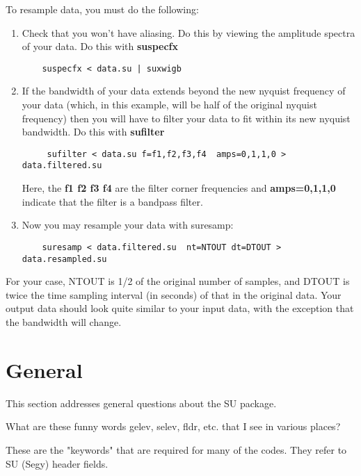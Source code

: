 {{{{{{{\begin{rmans}
To resample data, you must do the following: 

\begin{enumerate}
\item Check that you won't have aliasing. Do this by viewing the amplitude
spectra of your data. Do this with {\bf suspecfx\/}
{\small \begin{verbatim}
    suspecfx < data.su | suxwigb
\end{verbatim}} \noindent
\item If the bandwidth of your data extends beyond the new nyquist frequency
of your data (which, in this example, will be half of the original nyquist
frequency) then you will have to filter your data to fit within
its new nyquist bandwidth. Do this with {\bf sufilter\/}
{\small \begin{verbatim}
     sufilter < data.su f=f1,f2,f3,f4  amps=0,1,1,0 > data.filtered.su
\end{verbatim}} \noindent
Here, the {\bf f1 f2 f3 f4\/} are the filter corner frequencies and
{\bf amps=0,1,1,0\/} indicate that the filter is a bandpass filter.
\item Now you may resample your data with suresamp:
{\small \begin{verbatim}
    suresamp < data.filtered.su  nt=NTOUT dt=DTOUT > data.resampled.su
\end{verbatim}} \noindent
\end{enumerate}
For your case, NTOUT is 1/2 of the original number of samples, and
DTOUT is twice the time sampling interval (in seconds) of that in
the original data.  Your output data should look quite similar to 
your input data, with the exception that the bandwidth will change.
\end{rmans}

\section{General}
This section addresses general questions about the {\small\sf SU} package.

\begin{question}
What are these funny words gelev, selev, fldr, etc. that I see
in various places?
\end{question}

\begin{rmans}
These are the "keywords" that are required for many of the codes.
They refer to SU (Segy) header fields.


\end{rmans}}}}}}}}
